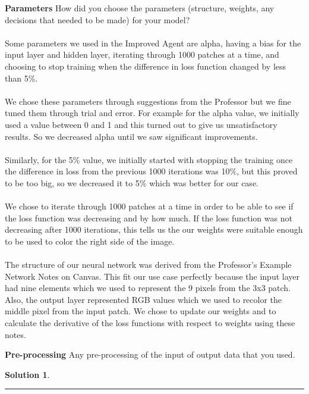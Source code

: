 \documentclass{article}
\theoremstyle{definition}
\def\fline{\rule{0.75\linewidth}{0.5pt}}
\newcommand{\finishline}{\vspace{-15pt}\begin{center}\fline\end{center}}
\newtheorem*{solution*}{Solution}
\newenvironment{solution}{\begin{solution*}}{{\finishline} \end{solution*}}
\begin{document}
    \textbf{Parameters}
        How did you choose the parameters (structure, weights, any decisions that needed to be made) for your model? \\\\
        Some parameters we used in the Improved Agent are alpha, having a bias for the input layer and hidden layer, iterating through 1000 patches at a time, and choosing to stop training when the difference in loss function changed by less than 5\%. \\\\
        We chose these parameters through suggestions from the Professor but we fine tuned them through trial and error. For example for the alpha value, we initially used a value between 0 and 1 and this turned out to give us unsatisfactory results. So we decreased alpha until we saw significant improvements. \\\\
        Similarly, for the 5\% value, we initially started with stopping the training once the difference in loss from the previous 1000 iterations was 10\%, but this proved to be too big, so we decreased it to 5\% which was better for our case. \\\\
        We chose to iterate through 1000 patches at a time in order to be able to see if the loss function was decreasing and by how much. If the loss function was not decreasing after 1000 iterations, this tells us the our weights were suitable enough to be used to color the right side of the image. \\\\
        The structure of our neural network was derived from the Professor's Example Network Notes on Canvas. This fit our use case perfectly because the input layer had nine elements which we used to represent the 9 pixels from the 3x3 patch. Also, the output layer represented RGB values which we used to recolor the middle pixel from the input patch. We chose to update our weights and to calculate the derivative of the loss functions with respect to weights using these notes.
        
    \textbf{Pre-processing}
        Any pre-processing of the input of output data that you used.
        \begin{solution} \hfill \\
    
        \end{solution}\\\\
        
\end{document}
